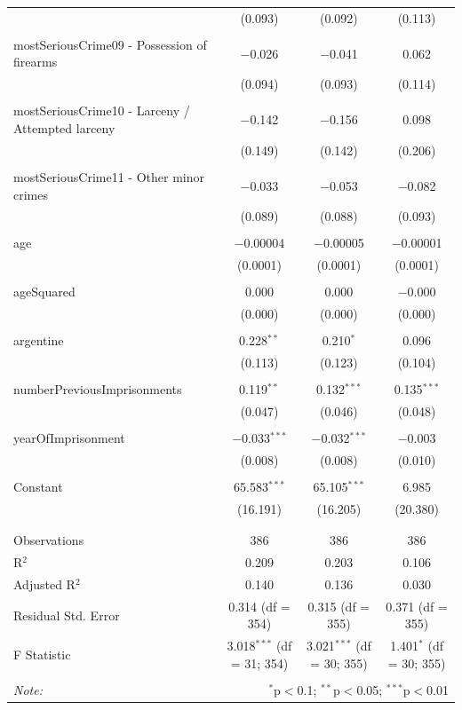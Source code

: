\documentclass[a4paper,12pt]{article}
\begin{document}
\begin{table}[!htbp]
{\begin{tabular}{@{\extracolsep{5pt}}lccc}
  & (0.093) & (0.092) & (0.113) \\ 
  & & & \\ 
 mostSeriousCrime09 - Possession of firearms & $-$0.026 & $-$0.041 & 0.062 \\ 
  & (0.094) & (0.093) & (0.114) \\ 
  & & & \\ 
 mostSeriousCrime10 - Larceny / Attempted larceny & $-$0.142 & $-$0.156 & 0.098 \\ 
  & (0.149) & (0.142) & (0.206) \\ 
  & & & \\ 
 mostSeriousCrime11 - Other minor crimes & $-$0.033 & $-$0.053 & $-$0.082 \\ 
  & (0.089) & (0.088) & (0.093) \\ 
  & & & \\ 
 age & $-$0.00004 & $-$0.00005 & $-$0.00001 \\ 
  & (0.0001) & (0.0001) & (0.0001) \\ 
  & & & \\ 
 ageSquared & 0.000 & 0.000 & $-$0.000 \\ 
  & (0.000) & (0.000) & (0.000) \\ 
  & & & \\ 
 argentine & 0.228$^{**}$ & 0.210$^{*}$ & 0.096 \\ 
  & (0.113) & (0.123) & (0.104) \\ 
  & & & \\ 
 numberPreviousImprisonments & 0.119$^{**}$ & 0.132$^{***}$ & 0.135$^{***}$ \\ 
  & (0.047) & (0.046) & (0.048) \\ 
  & & & \\ 
 yearOfImprisonment & $-$0.033$^{***}$ & $-$0.032$^{***}$ & $-$0.003 \\ 
  & (0.008) & (0.008) & (0.010) \\ 
  & & & \\ 
 
 Constant & 65.583$^{***}$ & 65.105$^{***}$ & 6.985 \\ 
  & (16.191) & (16.205) & (20.380) \\ 
  & & & \\ 
\hline \\[-1.8ex] 
Observations & 386 & 386 & 386 \\ 
R$^{2}$ & 0.209 & 0.203 & 0.106 \\ 
Adjusted R$^{2}$ & 0.140 & 0.136 & 0.030 \\ 
Residual Std. Error & 0.314 (df = 354) & 0.315 (df = 355) & 0.371 (df = 355) \\ 
F Statistic & 3.018$^{***}$ (df = 31; 354) & 3.021$^{***}$ (df = 30; 355) & 1.401$^{*}$ (df = 30; 355) \\ 
\hline 
\hline \\[-1.8ex] 
\textit{Note:}  & \multicolumn{3}{r}{$^{*}$p$<$0.1; $^{**}$p$<$0.05; $^{***}$p$<$0.01} \\ 
\end{tabular} }
\end{table} 


\newpage


\end{document}
